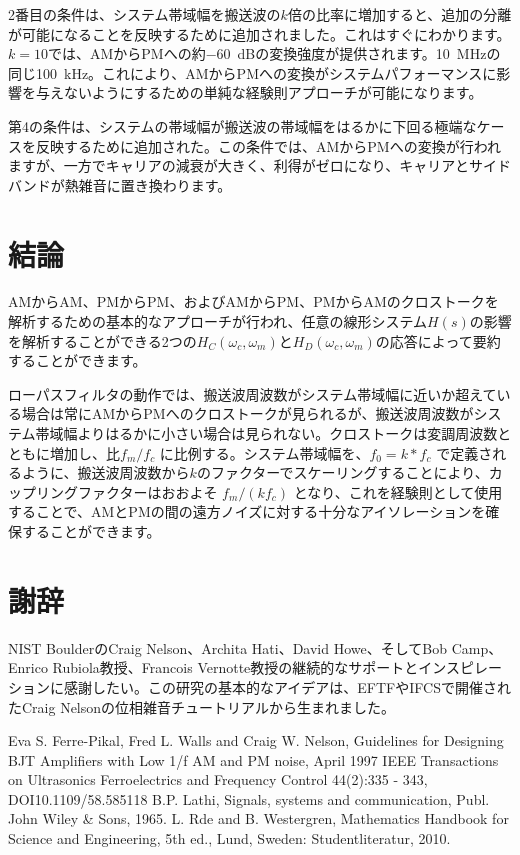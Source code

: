 \documentclass[article]{jlreq}
\begin{document}
2番目の条件は、システム帯域幅を搬送波の$k$倍の比率に増加すると、追加の分離が可能になることを反映するために追加されました。これはすぐにわかります。$k = 10$では、AMからPMへの約\SI{-60}{\dB}の変換強度が提供されます。\SI{10}{\MHz}の同じ\SI{100}{\kHz}。これにより、AMからPMへの変換がシステムパフォーマンスに影響を与えないようにするための単純な経験則アプローチが可能になります。

第4の条件は、システムの帯域幅が搬送波の帯域幅をはるかに下回る極端なケースを反映するために追加された。この条件では、AMからPMへの変換が行われますが、一方でキャリアの減衰が大きく、利得がゼロになり、キャリアとサイドバンドが熱雑音に置き換わります。

\section{結論}
AMからAM、PMからPM、およびAMからPM、PMからAMのクロストークを解析するための基本的なアプローチが行われ、任意の線形システム$H(s)$の影響を解析することができる2つの$H_C(\omega_c, \omega_m)$と$H_D(\omega_c,\omega_m)$の応答によって要約することができます。

ローパスフィルタの動作では、搬送波周波数がシステム帯域幅に近いか超えている場合は常にAMからPMへのクロストークが見られるが、搬送波周波数がシステム帯域幅よりはるかに小さい場合は見られない。クロストークは変調周波数とともに増加し、比$f_m/f_c$ に比例する。システム帯域幅を、$f_0 = k * f_c$ で定義されるように、搬送波周波数から$k$のファクターでスケーリングすることにより、カップリングファクターはおおよそ $f_m/(k f_c)$ となり、これを経験則として使用することで、AMとPMの間の遠方ノイズに対する十分なアイソレーションを確保することができます。

\section*{謝辞}

NIST BoulderのCraig Nelson、Archita Hati、David Howe、そしてBob Camp、Enrico Rubiola教授、Francois Vernotte教授の継続的なサポートとインスピレーションに感謝したい。この研究の基本的なアイデアは、EFTFやIFCSで開催されたCraig Nelsonの位相雑音チュートリアルから生まれました。

\begin{thebibliography}{9}
    Eva S. Ferre-Pikal, Fred L. Walls and Craig W. Nelson, Guidelines for Designing BJT Amplifiers with Low 1/f AM and PM noise, April 1997 IEEE Transactions on Ultrasonics Ferroelectrics and Frequency Control 44(2):335 - 343, DOI10.1109/58.585118
    B.P. Lathi, Signals, systems and communication, Publ. John Wiley \& Sons, 1965.
    L. Rde and B. Westergren, Mathematics Handbook for Science and Engineering, 5th ed., Lund, Sweden: Studentliteratur, 2010.
\end{thebibliography}
%
\end{document}
